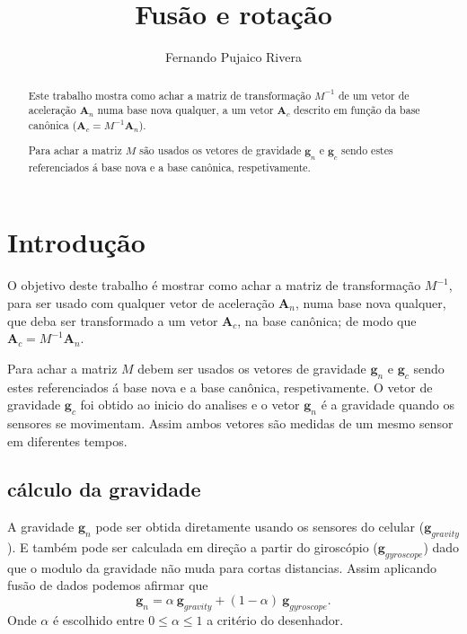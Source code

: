 \documentclass[a4paper,10pt]{report}
\title{Fusão  e rotação}
\author{Fernando Pujaico Rivera}
\begin{document}
\maketitle

\begin{abstract}
Este trabalho mostra como achar a matriz de transformação $M^{-1}$ de um vetor de aceleração $\mathbf{A}_n$
numa base nova qualquer, a um vetor $\mathbf{A}_c$ descrito em função da base canônica ($\mathbf{A}_c = M^{-1}\mathbf{A}_n$). 


Para achar a matriz $M$ são usados os vetores de gravidade $\mathbf{g}_n$ e $\mathbf{g}_c$
sendo estes referenciados á base nova e a base canônica, respetivamente.
\end{abstract}

\chapter{Introdução}

O objetivo deste trabalho é mostrar como achar a matriz de transformação $M^{-1}$, 
para ser usado com qualquer vetor de aceleração $\mathbf{A}_n$,
numa base nova qualquer, que deba ser transformado a um vetor $\mathbf{A}_c$, na base canônica; 
de modo que $\mathbf{A}_c = M^{-1}\mathbf{A}_n$. 


Para achar a matriz $M$ debem ser usados os vetores de gravidade $\mathbf{g}_n$ e $\mathbf{g}_c$
sendo estes referenciados á base nova e a base canônica, respetivamente. 
O vetor de gravidade $\mathbf{g}_c$ foi obtido ao inicio do analises e
o vetor $\mathbf{g}_n$ é a gravidade quando os sensores se movimentam.
Assim ambos vetores são medidas de um mesmo sensor em diferentes tempos.




\section{cálculo da gravidade}

A gravidade $\mathbf{g}_n$ pode ser obtida diretamente usando os sensores do celular ($\mathbf{g}_{gravity}$).
E também pode ser calculada em direção a partir do giroscópio ($\mathbf{g}_{gyroscope}$)
dado que o modulo da gravidade não muda para cortas distancias. Assim
aplicando fusão de dados podemos afirmar que
\begin{equation}
 \mathbf{g}_n=\alpha ~ \mathbf{g}_{gravity}+ (1-\alpha)~\mathbf{g}_{gyroscope}.
\end{equation}
Onde $\alpha$ é escolhido entre $0 \leq \alpha \leq 1$ a critério do desenhador.
\end{document}
